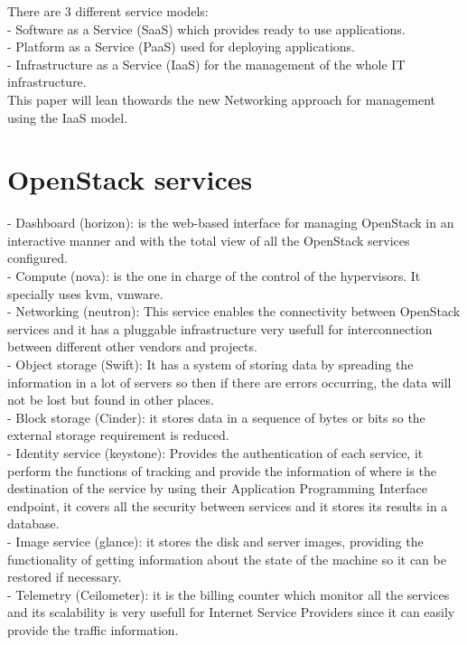 There are 3 different service models:\\
 
- Software as a Service (SaaS) which provides ready to use applications.\\
- Platform as a Service (PaaS) used for deploying applications.\\
- Infrastructure as a Service (IaaS) for the management of the whole IT infrastructure.\\

This paper will lean thowards the new Networking approach for management using the IaaS model.
 
\section{OpenStack services}
 
- Dashboard (horizon): is the web-based interface for managing OpenStack in an interactive manner and with the total view of all the OpenStack services configured.\\
- Compute (nova): is the one in charge of the control of the hypervisors. It specially uses kvm, vmware.\\
- Networking (neutron): This service enables the connectivity between OpenStack services and it has a pluggable infrastructure very usefull for interconnection between different other vendors and projects.\\
- Object storage (Swift): It has a system of storing data by spreading the information in a lot of servers so then if there are errors occurring, the data will not be lost but found in other places.\\
- Block storage (Cinder): it stores data in a sequence of bytes or bits so the external storage requirement is reduced.\\
- Identity service (keystone): Provides the authentication of each service, it perform the functions of tracking and provide the information of where is the destination of the service by using their Application Programming Interface endpoint, it covers all the security between services and it stores its results in a database. \\
- Image service (glance): it stores the disk and server images, providing the functionality of getting information about the state of the machine so it can be restored if necessary. \\
- Telemetry (Ceilometer): it is the billing counter which monitor all the services and its scalability is very usefull for Internet Service Providers since it can easily provide the traffic information.\\
 
